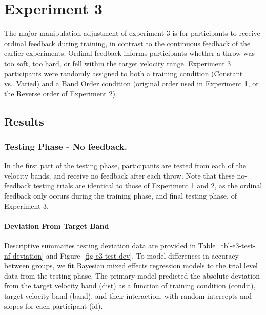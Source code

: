 \documentclass[
  letterpaper,
  DIV=11,
  numbers=noendperiod,
  oneside]{scrartcl}
\let\oldparagraph\paragraph
\renewcommand{\paragraph}[1]{\oldparagraph{#1}\mbox{}}
\begin{document}
\section{Experiment 3}\label{experiment-3}

The major manipulation adjustment of experiment 3 is for participants to
receive ordinal feedback during training, in contrast to the continuous
feedback of the earlier experiments. Ordinal feedback informs
participants whether a throw was too soft, too hard, or fell within the
target velocity range. Experiment 3 participants were randomly assigned
to both a training condition (Constant vs.~Varied) and a Band Order
condition (original order used in Experiment 1, or the Reverse order of
Experiment 2).

\subsection{Results}\label{results-1}

\subsubsection{Testing Phase - No
feedback.}\label{testing-phase---no-feedback.-2}

In the first part of the testing phase, participants are tested from
each of the velocity bands, and receive no feedback after each throw.
Note that these no-feedback testing trials are identical to those of
Experiment 1 and 2, as the ordinal feedback only occurs during the
training phase, and final testing phase, of Experiment 3.

\paragraph{Deviation From Target
Band}\label{deviation-from-target-band-2}

Descriptive summaries testing deviation data are provided in
Table~\ref{tbl-e3-test-nf-deviation} and Figure~\ref{fig-e3-test-dev}.
To model differences in accuracy between groups, we fit Bayesian mixed
effects regression models to the trial level data from the testing
phase. The primary model predicted the absolute deviation from the
target velocity band (dist) as a function of training condition
(condit), target velocity band (band), and their interaction, with
random intercepts and slopes for each participant (id).
\end{document}
